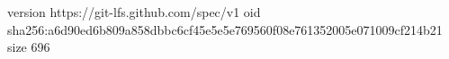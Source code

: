 version https://git-lfs.github.com/spec/v1
oid sha256:a6d90ed6b809a858dbbc6cf45e5e5e769560f08e761352005e071009cf214b21
size 696
